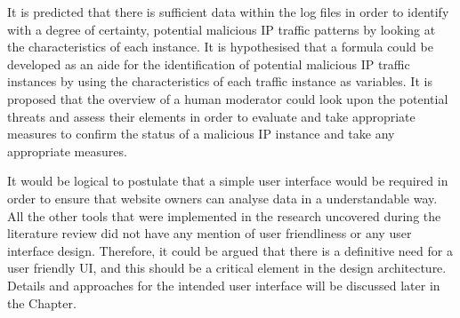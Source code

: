 It is predicted that there is sufficient data within the log files in order to identify with a degree of certainty, potential malicious IP traffic patterns by looking at the characteristics of each instance.
It is hypothesised that a formula could be developed as an aide for the identification of potential malicious IP traffic instances by using the characteristics of each traffic instance as variables. It is proposed that the overview of a human moderator could look upon the potential threats and assess their elements in order to evaluate and take appropriate measures to confirm the status of a malicious IP instance and take any appropriate measures. 

It would be logical to postulate that a simple user interface would be required in order to ensure that website owners can analyse data in a understandable way. All the other tools that were implemented in the research uncovered during the literature review did not have any mention of user friendliness or any user interface design. Therefore, it could be argued that there is a definitive need for a user friendly UI, and this should be a critical element in the design architecture. Details and approaches for the intended user interface will be discussed later in the Chapter.